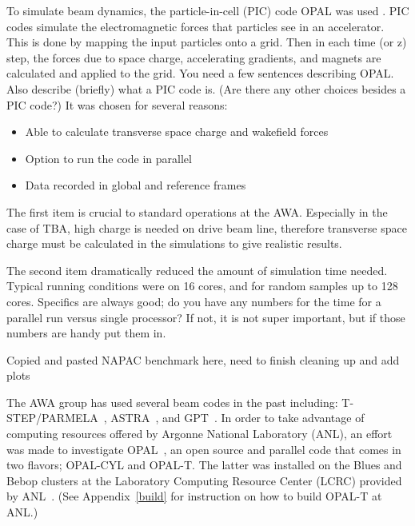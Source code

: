 \documentclass{iitthesis}
\newcommand{\lsnote}[1]{\textsf{{\color{violet}{ LS note:}   #1 }}}
\newcommand{\nrnote}[1]{\textsf{{\color{blue}{ NN note:}   #1 }}}
\begin{document}
To simulate beam dynamics, the particle-in-cell (PIC) code OPAL was used \cite{opal}. PIC codes simulate 
the electromagnetic forces that particles see in an accelerator. This is done by mapping the input 
particles onto a grid. Then in each time (or z) step, the forces due to space charge, accelerating gradients, 
and magnets are calculated and applied to the grid. 
\lsnote{You need a few sentences describing OPAL.  Also describe (briefly) what a PIC code is.  (Are there any other choices besides a PIC code?)}
It was chosen for several reasons:
\begin{itemize}
	\item Able to calculate transverse space charge and wakefield forces 
	\item Option to run the code in parallel
	\item Data recorded in global and reference frames
\end{itemize} 

The first item is crucial to standard operations at the AWA. Especially in the 
case of TBA, high charge is needed on drive beam line, therefore transverse 
space charge must be calculated in the simulations to give realistic results.

The second item dramatically reduced the amount of simulation time needed. 
Typical running conditions were on 16 cores, and for random samples up to 128 cores.  \lsnote{Specifics are always good; do you have any numbers for the time for a parallel run versus single processor?  If not, it is not super important, but if those numbers are handy put them in.}

\nrnote{Copied and pasted NAPAC benchmark here, need to finish cleaning up
and add plots}
 
The AWA group has used several beam codes in the past including:
T-STEP/PARMELA~\cite{parmela}, ASTRA~\cite{astra}, and GPT~\cite{gpt}.  
In order to take advantage of computing resources offered by 
Argonne National Laboratory (ANL), an effort was made to investigate
OPAL~\cite{opal}, an open source and parallel code that comes in two flavors;  
OPAL-CYL and OPAL-T. The latter was installed on the Blues and Bebop clusters
at the Laboratory Computing Resource Center (LCRC) provided by ANL~\cite{lcrc}.
(See Appendix~\ref{build} for instruction on how to build OPAL-T at ANL.)
\end{document}
